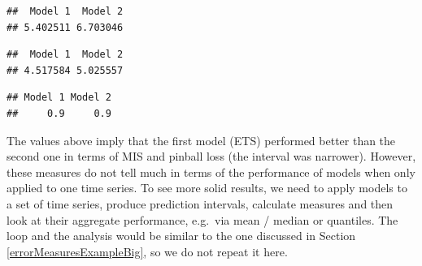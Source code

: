 \documentclass[]{book}
\newenvironment{Shaded}{\begin{snugshade}}{\end{snugshade}}
\newcommand{\CommentTok}[1]{\textcolor[rgb]{0.56,0.35,0.01}{\textit{#1}}}
\newcommand{\FloatTok}[1]{\textcolor[rgb]{0.00,0.00,0.81}{#1}}
\newcommand{\KeywordTok}[1]{\textcolor[rgb]{0.13,0.29,0.53}{\textbf{#1}}}
\newcommand{\NormalTok}[1]{#1}
\newcommand{\OperatorTok}[1]{\textcolor[rgb]{0.81,0.36,0.00}{\textbf{#1}}}
\newcommand{\StringTok}[1]{\textcolor[rgb]{0.31,0.60,0.02}{#1}}
\theoremstyle{definition}
\theoremstyle{definition}
\theoremstyle{definition}
\theoremstyle{definition}
\theoremstyle{remark}
\begin{document}
\begin{verbatim}
##  Model 1  Model 2 
## 5.402511 6.703046
\end{verbatim}

\begin{Shaded}
\end{Shaded}

\begin{verbatim}
##  Model 1  Model 2 
## 4.517584 5.025557
\end{verbatim}

\begin{Shaded}
\end{Shaded}

\begin{verbatim}
## Model 1 Model 2 
##     0.9     0.9
\end{verbatim}

The values above imply that the first model (ETS) performed better than the second one in terms of MIS and pinball loss (the interval was narrower). However, these measures do not tell much in terms of the performance of models when only applied to one time series. To see more solid results, we need to apply models to a set of time series, produce prediction intervals, calculate measures and then look at their aggregate performance, e.g.~via mean / median or quantiles. The loop and the analysis would be similar to the one discussed in Section \ref{errorMeasuresExampleBig}, so we do not repeat it here.
\end{document}
